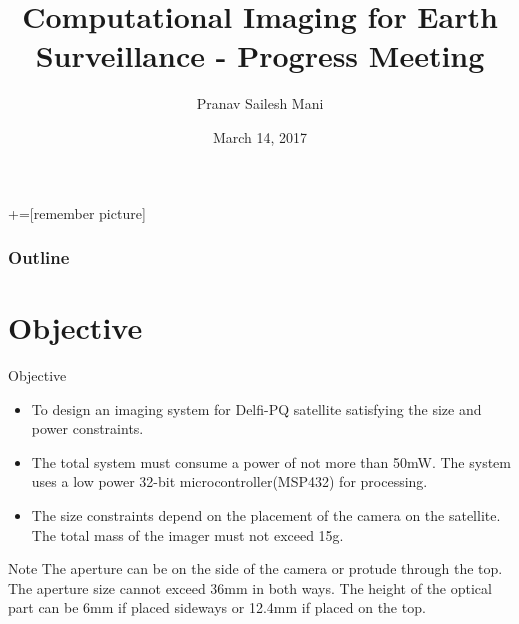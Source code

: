\documentclass{beamer}
\title[Progress Meeting 2]{ Computational Imaging for Earth Surveillance - Progress Meeting  }
\institute[TU Delft]{Delft University of Technology}
\author{Pranav Sailesh Mani}
\date{March 14, 2017}
\newcommand*\titleTOC{Outline}
\begin{document}
+=[remember picture]
{
%
\frame{\titlepage}
}

{
\begin{frame}\frametitle{\titleTOC}
	\tableofcontents
\end{frame}
}

\section{Objective}
\begin{frame}{Objective}

\begin{itemize}
  \item To design an imaging system for Delfi-PQ satellite satisfying the size and power constraints.
  \item The total system must consume a power of not more than 50mW. The system uses a low power 32-bit microcontroller(MSP432) for processing. 
  \item The size constraints depend on the placement of the camera on the satellite. The total mass of the imager must not exceed 15g.
 
\end{itemize}

\begin{block}{Note}
The aperture can be on the side of the camera or protude through the top. The aperture size cannot exceed 36mm in both ways. The height of the optical part can be 6mm if placed sideways or 12.4mm if placed on the top. 
\end{block}

\end{frame}
\end{document}
